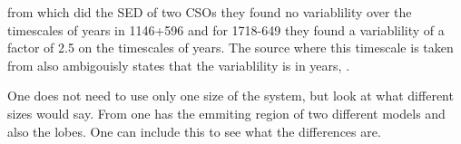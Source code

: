 \documentclass[11pt]{article}
\begin{document}
from \cite{bronzini2024investigating} which did the SED of two CSOs they found no variablility over the timescales of years in 1146+596 and for 1718-649 they found a variablility of a factor of 2.5 on the timescales of years. The source where this timescale is 
taken from also ambigouisly states that the variablility is in years, \cite{Beuchert_2018}. 

One does not need to use only one size of the system, but look at what different sizes would say. From 
\cite{bronzini2024investigating} one has the emmiting region of two different models and also the lobes. One can include this to see what the differences are. 




\newpage
\printbibliography
\end{document}
